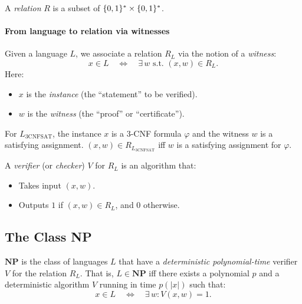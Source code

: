 \documentclass[11pt]{article}
\begin{document}
\begin{tcolorbox}[colback=blue!5!white, colframe=blue!50!black, title=Relations]
\begin{definition}[Relation]
A \emph{relation} $R$ is a subset of $\{0,1\}^* \times \{0,1\}^*$.
\end{definition}
\end{tcolorbox}

\paragraph{From language to relation via witnesses}
Given a language $L$, we associate a relation $R_L$ via the notion of a \emph{witness}:
\[
  x \in L \quad \iff \quad \exists\, w \text{ s.t. } (x, w) \in R_L.
\]
Here:
\begin{itemize}
  \item $x$ is the \emph{instance} (the ``statement'' to be verified).
  \item $w$ is the \emph{witness} (the ``proof'' or ``certificate'').
\end{itemize}

\begin{example}
For $L_{\mathrm{3CNFSAT}}$, the instance $x$ is a 3-CNF formula $\varphi$ and the witness
$w$ is a satisfying assignment.
$(x, w) \in R_{L_{\mathrm{3CNFSAT}}}$ iff $w$ is a satisfying assignment for $\varphi$.
\end{example}

\begin{definition}
A \emph{verifier} (or \emph{checker}) $V$ for $R_L$ is an algorithm that:
\begin{itemize}
  \item Takes input $(x, w)$.
  \item Outputs $1$ if $(x, w) \in R_L$, and $0$ otherwise.
\end{itemize}
\end{definition}

\subsection{The Class NP}

\begin{tcolorbox}[colback=orange!10!white, colframe=orange!60!black, title=Definition of NP]
\begin{definition}[NP]
$\mathbf{NP}$ is the class of languages $L$ that have a \emph{deterministic polynomial-time}
verifier $V$ for the relation $R_L$.
That is, $L \in \mathbf{NP}$ iff there exists a polynomial $p$ and a deterministic
algorithm $V$ running in time $p(|x|)$ such that:
\[
  x \in L \quad \iff \quad \exists\, w : V(x, w) = 1.
\]
\end{definition}
\end{tcolorbox}
\end{document}
